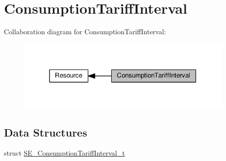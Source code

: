 \hypertarget{group__ConsumptionTariffInterval}{}\section{Consumption\+Tariff\+Interval}
\label{group__ConsumptionTariffInterval}
Collaboration diagram for Consumption\+Tariff\+Interval\+:\nopagebreak
\begin{figure}[H]
\begin{center}
\leavevmode
\includegraphics[width=304pt]{group__ConsumptionTariffInterval}
\end{center}
\end{figure}
\subsection*{Data Structures}
\begin{DoxyCompactItemize}
\item 
struct \hyperlink{structSE__ConsumptionTariffInterval__t}{S\+E\+\_\+\+Consumption\+Tariff\+Interval\+\_\+t}
\end{DoxyCompactItemize}
